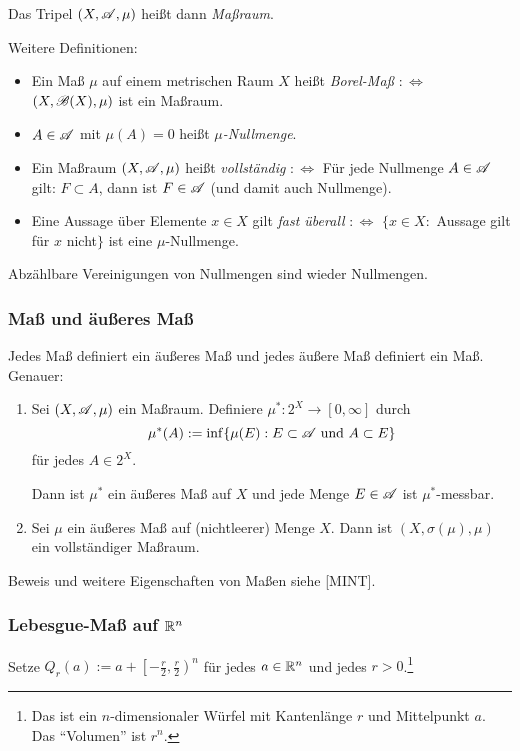 Das Tripel $(X, \mathscr{A}, \mu)$ heißt dann \emph{Maßraum}.

Weitere Definitionen:
\begin{itemize}
 \item Ein Maß $\mu$ auf einem metrischen Raum $X$ heißt \emph{Borel-Maß} $:\Leftrightarrow$ $(X, \mathscr{B}(X), \mu)$ ist ein Maßraum.
 \item $A \in \mathscr{A}$ mit $\mu(A) = 0$ heißt \emph{$\mu$-Nullmenge}.
 \item Ein Maßraum $(X, \mathscr{A}, \mu)$ heißt \emph{vollständig} $:\Leftrightarrow$ Für jede Nullmenge $A \in \mathscr{A}$ gilt: $F \subset A$, dann ist $F \in \mathscr{A}$ (und damit auch Nullmenge).
 \item Eine Aussage über Elemente $x \in X$ gilt \emph{fast überall} $:\Leftrightarrow$
 $\{ x \in X :$  Aussage gilt für  $x$ nicht$\}$
 ist eine $\mu$-Nullmenge.
\end{itemize}

\begin{rmrk}
 Abzählbare Vereinigungen von Nullmengen sind wieder Nullmengen.
\end{rmrk}

\subsubsection{Maß und äußeres Maß}
\begin{thm}
 Jedes Maß definiert ein äußeres Maß und jedes äußere Maß definiert ein Maß. Genauer:
 \begin{enumerate}
  \item Sei $(X,\mathscr{A},\mu)$ ein Maßraum. Definiere $\mu^\ast:2^X \to [0,\infty]$ durch
  \[ \mu^\ast(A) := \inf \{ \mu(E) : E \subset \mathscr{A} \text{ und } A \subset E \} \]
  für jedes $A \in 2^X$.
  
  Dann ist $\mu^\ast$ ein äußeres Maß auf $X$ und jede Menge $E \in \mathscr{A}$ ist $\mu^\ast$-messbar.
  \item Sei $\mu$ ein äußeres Maß auf (nichtleerer) Menge $X$. Dann ist $(X, \sigma(\mu), \mu)$ ein voll\-ständiger Maßraum.
 \end{enumerate}
\end{thm}

Beweis und weitere Eigenschaften von Maßen siehe [MINT].

\subsubsection{Lebesgue-Maß auf \texorpdfstring{$\mathbb{R}^n$}{IRn}}
Setze $Q_r(a) := a + \left[ - \frac{r}{2}, \frac{r}{2} \right)^n$ für jedes $a \in \mathbb{R}^n$ und jedes $r > 0$.\footnote{Das ist ein $n$-dimensionaler Würfel mit Kantenlänge $r$ und Mittelpunkt $a$. Das ``Volumen'' ist $r^n$.}

